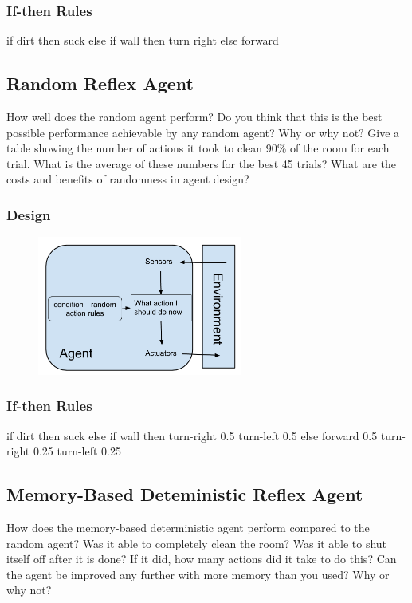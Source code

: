 \documentclass[a4paper,10pt]{article}
\begin{document}
\subsubsection{If-then Rules}
if dirt then suck
else if wall then turn right
else forward


\subsection{Random Reflex Agent}
How well does the random agent perform? Do you think that this is the best possible performance achievable by any random agent? Why or why not? Give a table showing the number of actions it took to clean 90\% of the room for each trial. What is the average of these numbers for the best 45 trials? What are the costs and benefits of randomness in agent design?
\subsubsection{Design}
\begin{figure}[H]
	\begin{center}
		\includegraphics[width=0.6\textwidth]{RandomReflex.png}
	\end{center}
\end{figure}
\subsubsection{If-then Rules}
if dirt then suck
else if wall then turn-right 0.5 turn-left 0.5
else forward 0.5 turn-right 0.25 turn-left 0.25


\subsection{Memory-Based Deteministic Reflex Agent}
How does the memory-based deterministic agent perform compared to the random agent? Was it able to completely clean the room? Was it able to shut itself off after it is done? If it did, how many actions did it take to do this? Can the agent be improved any further with more memory than you used? Why or why not?
\end{document}
